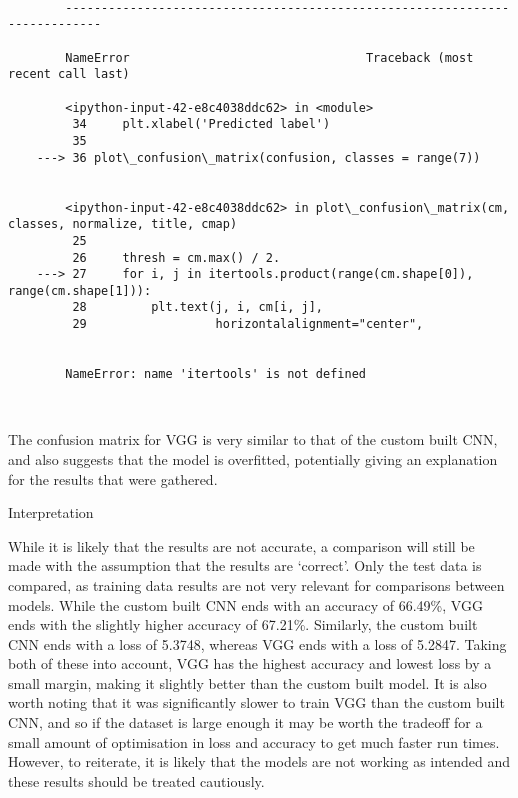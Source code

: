 \documentclass[11pt]{article}
\begin{document}
    \begin{Verbatim}[commandchars=\\\{\}]

        ---------------------------------------------------------------------------

        NameError                                 Traceback (most recent call last)

        <ipython-input-42-e8c4038ddc62> in <module>
         34     plt.xlabel('Predicted label')
         35 
    ---> 36 plot\_confusion\_matrix(confusion, classes = range(7))
    

        <ipython-input-42-e8c4038ddc62> in plot\_confusion\_matrix(cm, classes, normalize, title, cmap)
         25 
         26     thresh = cm.max() / 2.
    ---> 27     for i, j in itertools.product(range(cm.shape[0]), range(cm.shape[1])):
         28         plt.text(j, i, cm[i, j],
         29                  horizontalalignment="center",
    

        NameError: name 'itertools' is not defined

    \end{Verbatim}

    \begin{center}
    \end{center}
    { \hspace*{\fill} \\}
    
    The confusion matrix for VGG is very similar to that of the custom built
CNN, and also suggests that the model is overfitted, potentially giving
an explanation for the results that were gathered.

    Interpretation

While it is likely that the results are not accurate, a comparison will
still be made with the assumption that the results are `correct'. Only
the test data is compared, as training data results are not very
relevant for comparisons between models. While the custom built CNN ends
with an accuracy of 66.49\%, VGG ends with the slightly higher accuracy
of 67.21\%. Similarly, the custom built CNN ends with a loss of 5.3748,
whereas VGG ends with a loss of 5.2847. Taking both of these into
account, VGG has the highest accuracy and lowest loss by a small margin,
making it slightly better than the custom built model. It is also worth
noting that it was significantly slower to train VGG than the custom
built CNN, and so if the dataset is large enough it may be worth the
tradeoff for a small amount of optimisation in loss and accuracy to get
much faster run times. However, to reiterate, it is likely that the
models are not working as intended and these results should be treated
cautiously.
\end{document}

